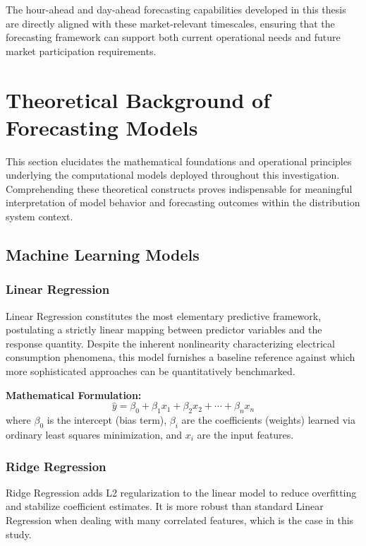 \documentclass[oneside, 12pt]{book}
\numberwithin{equation}{chapter}
\newcommand{\sizexii}{\fontsize{12pt}{6pt}\selectfont}
\begin{document}
The hour-ahead and day-ahead forecasting capabilities developed in this thesis are directly aligned with these market-relevant timescales, ensuring that the forecasting framework can support both current operational needs and future market participation requirements.


\section{\sizexii Theoretical Background of Forecasting Models}

This section elucidates the mathematical foundations and operational principles underlying the computational models deployed throughout this investigation. Comprehending these theoretical constructs proves indispensable for meaningful interpretation of model behavior and forecasting outcomes within the distribution system context.

\subsection{\sizexii Machine Learning Models}

\subsubsection{Linear Regression}

Linear Regression constitutes the most elementary predictive framework, postulating a strictly linear mapping between predictor variables and the response quantity. Despite the inherent nonlinearity characterizing electrical consumption phenomena, this model furnishes a baseline reference against which more sophisticated approaches can be quantitatively benchmarked.

\textbf{Mathematical Formulation:}
\begin{equation}
\hat{y} = \beta_0 + \beta_1 x_1 + \beta_2 x_2 + \cdots + \beta_n x_n
\end{equation}
where $\beta_0$ is the intercept (bias term), $\beta_i$ are the coefficients (weights) learned via ordinary least squares minimization, and $x_i$ are the input features.

\subsubsection{Ridge Regression}

Ridge Regression \parencite{hoerl1970ridge} adds L2 regularization to the linear model to reduce overfitting and stabilize coefficient estimates. It is more robust than standard Linear Regression when dealing with many correlated features, which is the case in this study.
\end{document}
